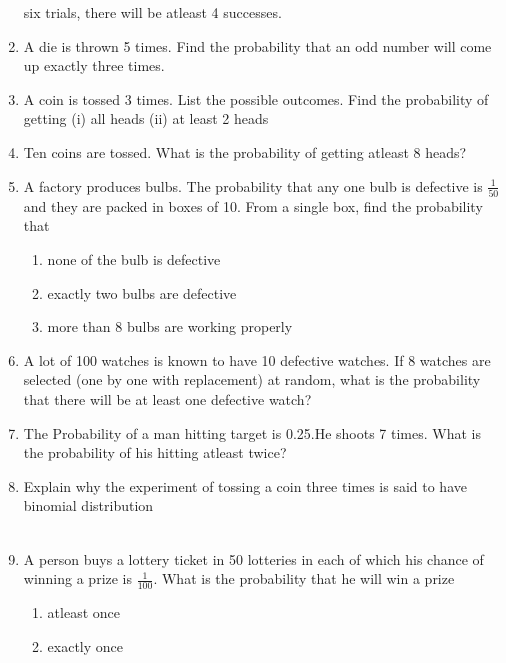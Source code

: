 \begin{enumerate}[label=\thesection.\arabic*,ref=\thesection.\theenumi]
six trials, there will be atleast 4 successes.
\solution

\item A die is thrown 5 times. Find the probability that an odd number will come up exactly three times.
		\solution
	
\item A coin is tossed 3 times. List the possible outcomes. Find the probability of getting
(i) all heads (ii) at least 2 heads \\
\solution

\item Ten coins are tossed. What is the probability of getting atleast 8 heads?
\\

\item A factory produces bulbs. The probability that any one bulb is defective is $\frac{1}{50}$ and they are packed in boxes of 10. From a single box, find the probability that
\begin{enumerate}
\item none of the bulb is defective 
\item exactly two bulbs are defective 
\item more than 8 bulbs are working properly
\end{enumerate}
\solution

\item A lot of 100 watches is known to have 10 defective watches. If 8 watches are
selected (one by one with replacement) at random, what is the probability that
there will be at least one defective watch?
\\ 
\item The Probability of a man hitting  target is 0.25.He shoots 7 times. What is the probability of his hitting atleast twice?\\

\item Explain why the experiment of tossing a coin three times is said to have binomial distribution
\\ \solution 
\\ 
\item A person buys a lottery ticket in 50 lotteries in each of which his chance of winning a prize is $\frac{1}{100}$. What is the probability that he will win a prize
\begin{enumerate}[label=(\alph*)]
 \item  atleast once 
 \item exactly once 

\end{enumerate}
\end{enumerate}

